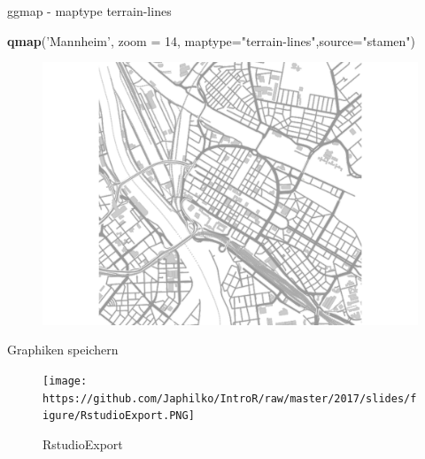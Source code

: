 \documentclass[ignorenonframetext,]{beamer}
\newenvironment{Shaded}{}{}
\newcommand{\KeywordTok}[1]{\textcolor[rgb]{0.00,0.44,0.13}{\textbf{{#1}}}}
\newcommand{\DataTypeTok}[1]{\textcolor[rgb]{0.56,0.13,0.00}{{#1}}}
\newcommand{\DecValTok}[1]{\textcolor[rgb]{0.25,0.63,0.44}{{#1}}}
\newcommand{\StringTok}[1]{\textcolor[rgb]{0.25,0.44,0.63}{{#1}}}
\newcommand{\NormalTok}[1]{{#1}}
\begin{document}
\begin{frame}[fragile]{ggmap - maptype terrain-lines}

\begin{Shaded}
\begin{Highlighting}[]
\KeywordTok{qmap}\NormalTok{(}\StringTok{'Mannheim'}\NormalTok{, }\DataTypeTok{zoom =} \DecValTok{14}\NormalTok{,}
 \DataTypeTok{maptype=}\StringTok{"terrain-lines"}\NormalTok{,}\DataTypeTok{source=}\StringTok{"stamen"}\NormalTok{)}
\end{Highlighting}
\end{Shaded}

\begin{figure}[htbp]
\centering
\includegraphics{RSocialScience2_files/figure-beamer/unnamed-chunk-45-1.pdf}
\caption{}
\end{figure}

\end{frame}

\begin{frame}{Graphiken speichern}

\begin{figure}[htbp]
\centering
\texttt{[image: https://github.com/Japhilko/IntroR/raw/master/2017/slides/figure/RstudioExport.PNG]}
\caption{RstudioExport}
\end{figure}

\end{frame}
\end{document}
